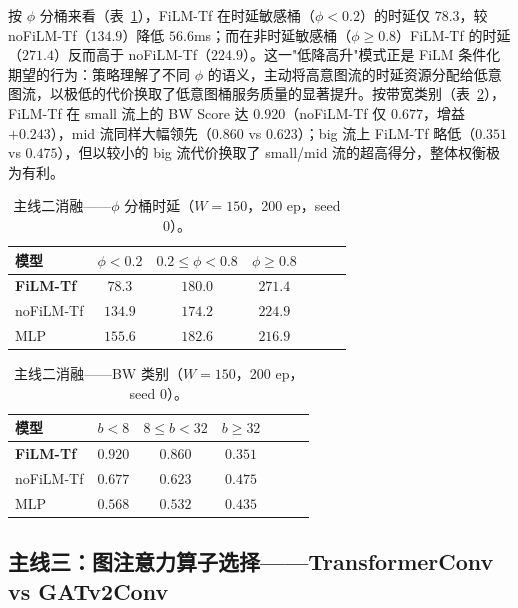 按 $\phi$ 分桶来看（表~\ref{tab:film_w150_phi}），FiLM-Tf 在时延敏感桶（$\phi<0.2$）的时延仅 $78.3$，较 noFiLM-Tf（$134.9$）降低 $56.6$ms；而在非时延敏感桶（$\phi\geq 0.8$）FiLM-Tf 的时延（$271.4$）反而高于 noFiLM-Tf（$224.9$）。这一"低降高升"模式正是 FiLM 条件化期望的行为：策略理解了不同 $\phi$ 的语义，主动将高意图流的时延资源分配给低意图流，以极低的代价换取了低意图桶服务质量的显著提升。按带宽类别（表~\ref{tab:film_w150_bw}），FiLM-Tf 在 small 流上的 BW Score 达 $0.920$（noFiLM-Tf 仅 $0.677$，增益 $+0.243$），mid 流同样大幅领先（$0.860$ vs $0.623$）；big 流上 FiLM-Tf 略低（$0.351$ vs $0.475$），但以较小的 big 流代价换取了 small/mid 流的超高得分，整体权衡极为有利。

\begin{table}[t]
\centering
\caption{主线二消融——$\phi$ 分桶时延（$W\!=\!150$，200 ep，seed 0）\protect\footnotemark[1]。}
\label{tab:film_w150_phi}
\setlength{\tabcolsep}{3pt}
\begin{tabular}{lcccccc}
\toprule
模型 & $\phi<0.2$ & $0.2\!\le\!\phi\!<\!0.8$ & $\phi\!\ge\!0.8$ \\
\midrule
\textbf{FiLM-Tf} & $\mathbf{78.3}$ & $180.0$ & $271.4$ \\
noFiLM-Tf        & $134.9$ & $174.2$ & $224.9$ \\
MLP              & $155.6$ & $182.6$ & $216.9$ \\
\bottomrule
\end{tabular}
\end{table}

\begin{table}[t]
\centering
\caption{主线二消融——BW 类别（$W\!=\!150$，200 ep，seed 0）\protect\footnotemark[1]。}
\label{tab:film_w150_bw}
\setlength{\tabcolsep}{3pt}
\begin{tabular}{lcccccc}
\toprule
模型 & $b<8$ & $8\!\le\!b\!<\!32$ & $b\!\ge\!32$ \\
\midrule
\textbf{FiLM-Tf} & $\mathbf{0.920}$ & $\mathbf{0.860}$ & $0.351$ \\
noFiLM-Tf        & $0.677$ & $0.623$ & $0.475$ \\
MLP              & $0.568$ & $0.532$ & $0.435$ \\
\bottomrule
\end{tabular}
\end{table}

\subsection{主线三：图注意力算子选择——TransformerConv vs GATv2Conv}
\label{sec:exp:conv}

